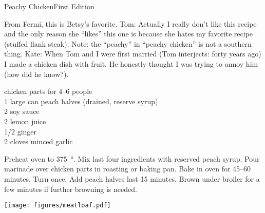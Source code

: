 \begin{entry}{Peachy Chicken}{First Edition}

\begin{open}
  From Fermi, this is Betsy's favorite.  Tom: Actually I really don't
  like this recipe and the only reason she ``likes'' this one is because she
  hates my favorite recipe (stuffed flank steak).  Note: the ``peachy'' in
  ``peachy chicken'' is not a southern thing.  Kate: When Tom and I were first
  married (Tom interjects: forty years ago) I made a chicken dish with fruit.
  He honestly thought I was trying to annoy him (how did he know?).
\end{open}
\begin{ingredients}
  chicken parts for \numrange{4}{6} people\\
  1 large can peach halves (drained, reserve syrup)\\
  \SI{2}{\tblspoon} soy sauce\\
  \SI{2}{\tblspoon} lemon juice\\
  \SI{1/2}{\tblspoon} ginger\\
  2 cloves minced garlic
\end{ingredients}
Preheat oven to \SI{375}{\degree}.  Mix last four ingredients with reserved peach
syrup.  Pour marinade over chicken parts in roasting or baking pan. Bake in
oven for \numrange{45}{60} minutes. Turn once.  Add peach halves last
15 minutes.  Brown under broiler for a few minutes if further browning
is needed.
\begin{center}
    \texttt{[image: figures/meatloaf.pdf]}
\end{center}
\end{entry}

